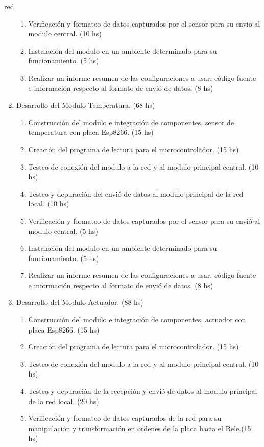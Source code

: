 \documentclass[11pt]{charter}
\begin{document}
\begin{consigna}{red}
\begin{enumerate}
\begin{enumerate}
	\item Verificación y formateo de datos capturados por el sensor para su envió al modulo central. (10 hs)
	\item Instalación del modulo en un ambiente determinado para su funcionamiento. (5 hs)
	\item Realizar un informe resumen de las configuraciones a usar, código fuente e información respecto al formato de envió de datos. (8 hs)
	\end{enumerate}
\item Desarrollo del Modulo Temperatura. (68 hs)
	\begin{enumerate}
	\item Construcción del modulo e integración de componentes, sensor de temperatura con placa Esp8266. (15 hs)
	\item Creación del programa de lectura para el microcontrolador. (15 hs)
	\item Testeo de conexión del modulo a la red y al modulo principal central. (10 hs)
	\item Testeo y depuración del envió de datos al modulo principal de la red local. (10 hs)
	\item Verificación y formateo de datos capturados por el sensor para su envió al modulo central. (5 hs)
	\item Instalación del modulo en un ambiente determinado para su funcionamiento. (5 hs)
	\item Realizar un informe resumen de las configuraciones a usar, código fuente e información respecto al formato de envió de datos. (8 hs)
	\end{enumerate}
\item Desarrollo del Modulo Actuador. (88 hs)
	\begin{enumerate}
	\item Construcción del modulo e integración de componentes, actuador con placa Esp8266. (15 hs)
	\item Creación del programa de lectura para el microcontrolador. (15 hs)
	\item Testeo de conexión del modulo a la red y al modulo principal central. (10 hs)
	\item Testeo y depuración de la recepción y envió de datos al modulo principal de la red local. (20 hs)
	\item Verificación y formateo de datos capturados de la red para su manipulación y transformación en ordenes de la placa hacia el Rele.(15 hs)

\end{enumerate}
\end{enumerate}
\end{consigna}
\end{document}
